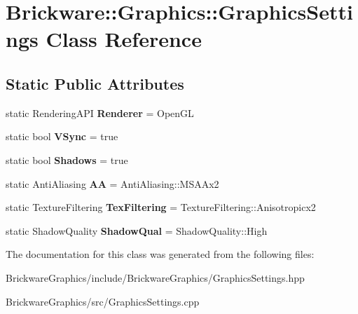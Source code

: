 \hypertarget{classBrickware_1_1Graphics_1_1GraphicsSettings}{}\section{Brickware\+:\+:Graphics\+:\+:Graphics\+Settings Class Reference}
\label{classBrickware_1_1Graphics_1_1GraphicsSettings}
\subsection*{Static Public Attributes}
\begin{DoxyCompactItemize}
\item 
\hypertarget{classBrickware_1_1Graphics_1_1GraphicsSettings_acee53e16a36e0c2bd2075496ab9fecc8}{}static Rendering\+A\+P\+I {\bfseries Renderer} = Open\+G\+L\label{classBrickware_1_1Graphics_1_1GraphicsSettings_acee53e16a36e0c2bd2075496ab9fecc8}

\item 
\hypertarget{classBrickware_1_1Graphics_1_1GraphicsSettings_a5f50396420f344594420a9bbaf1603a7}{}static bool {\bfseries V\+Sync} = true\label{classBrickware_1_1Graphics_1_1GraphicsSettings_a5f50396420f344594420a9bbaf1603a7}

\item 
\hypertarget{classBrickware_1_1Graphics_1_1GraphicsSettings_a4a05794c145642e462d3726bccb81b08}{}static bool {\bfseries Shadows} = true\label{classBrickware_1_1Graphics_1_1GraphicsSettings_a4a05794c145642e462d3726bccb81b08}

\item 
\hypertarget{classBrickware_1_1Graphics_1_1GraphicsSettings_a2f5880b9a39c0d4033b3adb11bf5e2f7}{}static Anti\+Aliasing {\bfseries A\+A} = Anti\+Aliasing\+::\+M\+S\+A\+Ax2\label{classBrickware_1_1Graphics_1_1GraphicsSettings_a2f5880b9a39c0d4033b3adb11bf5e2f7}

\item 
\hypertarget{classBrickware_1_1Graphics_1_1GraphicsSettings_a2d90126874effbd4842950397b39491e}{}static Texture\+Filtering {\bfseries Tex\+Filtering} = Texture\+Filtering\+::\+Anisotropicx2\label{classBrickware_1_1Graphics_1_1GraphicsSettings_a2d90126874effbd4842950397b39491e}

\item 
\hypertarget{classBrickware_1_1Graphics_1_1GraphicsSettings_a57f7533f7a6d6f06fd980fecd97c26ff}{}static Shadow\+Quality {\bfseries Shadow\+Qual} = Shadow\+Quality\+::\+High\label{classBrickware_1_1Graphics_1_1GraphicsSettings_a57f7533f7a6d6f06fd980fecd97c26ff}

\end{DoxyCompactItemize}


The documentation for this class was generated from the following files\+:\begin{DoxyCompactItemize}
\item 
Brickware\+Graphics/include/\+Brickware\+Graphics/Graphics\+Settings.\+hpp\item 
Brickware\+Graphics/src/Graphics\+Settings.\+cpp\end{DoxyCompactItemize}
